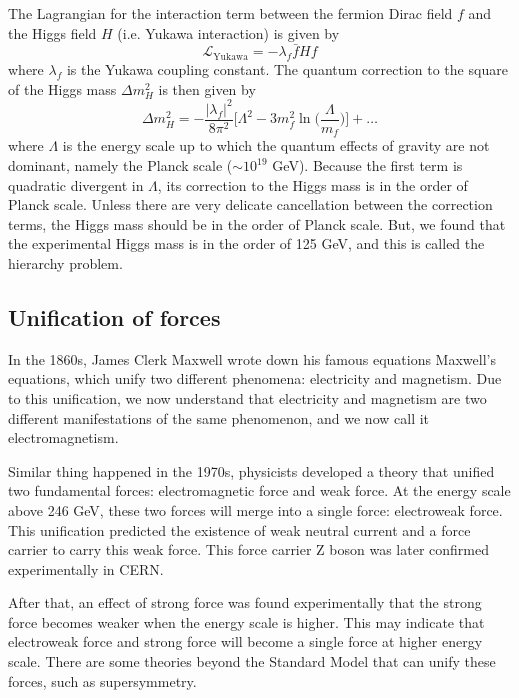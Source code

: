The Lagrangian for the interaction term between the fermion Dirac field $f$ and the Higgs field $H$ (i.e. Yukawa interaction) is given by
\begin{equation}
\mathcal{L}_{\text{Yukawa}} = - \lambda_f \bar{f} H f
\end{equation}
where $\lambda_f$ is the Yukawa coupling constant.
The quantum correction to the square of the Higgs mass $\Delta m^2_H$ is then given by \cite{primer}
\begin{equation}
\Delta m^2_H = - \frac{|\lambda_f|^2}{8 \pi^2} \Big[ \Lambda^2 - 3 m_f^2 \ln \Big( \frac{\Lambda}{m_f} \Big) \Big] + \dots
\label{eq:higgs_correction}
\end{equation}
where $\Lambda$ is the energy scale up to which the quantum effects of gravity are not dominant, namely the Planck scale ($\sim 10^{19}$ GeV).
Because the first term is quadratic divergent in $\Lambda$, its correction to the Higgs mass is in the order of Planck scale.
Unless there are very delicate cancellation between the correction terms, the Higgs mass should be in the order of Planck scale.
But, we found that the experimental Higgs mass is in the order of 125 GeV, and this is called the hierarchy problem.

\subsection{Unification of forces}
In the 1860s, James Clerk Maxwell wrote down his famous equations Maxwell's equations, which unify two different phenomena: electricity and magnetism.
Due to this unification, we now understand that electricity and magnetism are two different manifestations of the same phenomenon, and we now call it electromagnetism.

Similar thing happened in the 1970s, physicists developed a theory that unified two fundamental forces: electromagnetic force and weak force.
At the energy scale above 246 GeV, these two forces will merge into a single force: electroweak force.
This unification predicted the existence of weak neutral current and a force carrier to carry this weak force.
This force carrier Z boson was later confirmed experimentally in CERN.

After that, an effect of strong force was found experimentally that the strong force becomes weaker when the energy scale is higher.
This may indicate that electroweak force and strong force will become a single force at higher energy scale.
There are some theories beyond the Standard Model that can unify these forces, such as supersymmetry.

